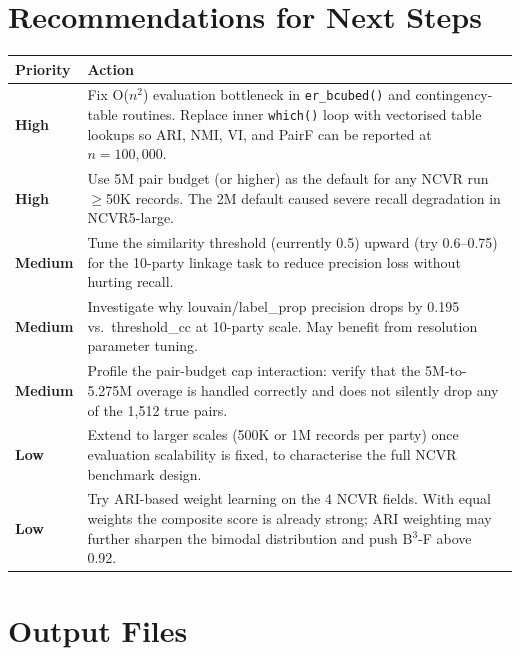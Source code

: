 \documentclass[11pt, a4paper]{article}
\begin{document}
\section{Recommendations for Next Steps}

\begin{table}[h!]
\centering
\begin{tabularx}{\linewidth}{lW}
\toprule
\textbf{Priority} & \textbf{Action} \\
\midrule
{\color{highprio}\textbf{High}} &
  Fix O($n^2$) evaluation bottleneck in \texttt{er\_bcubed()} and contingency-table
  routines. Replace inner \texttt{which()} loop with vectorised table lookups so
  ARI, NMI, VI, and PairF can be reported at $n = 100{,}000$. \\[4pt]
{\color{highprio}\textbf{High}} &
  Use 5M pair budget (or higher) as the default for any NCVR run $\geq$50K records.
  The 2M default caused severe recall degradation in NCVR5-large. \\[4pt]
{\color{medprio}\textbf{Medium}} &
  Tune the similarity threshold (currently 0.5) upward (try 0.6--0.75) for
  the 10-party linkage task to reduce precision loss without hurting recall. \\[4pt]
{\color{medprio}\textbf{Medium}} &
  Investigate why louvain/label\_prop precision drops by 0.195 vs.\ threshold\_cc
  at 10-party scale. May benefit from resolution parameter tuning. \\[4pt]
{\color{medprio}\textbf{Medium}} &
  Profile the pair-budget cap interaction: verify that the 5M-to-5.275M overage
  is handled correctly and does not silently drop any of the 1,512 true pairs. \\[4pt]
{\color{lowprio}\textbf{Low}} &
  Extend to larger scales (500K or 1M records per party) once evaluation
  scalability is fixed, to characterise the full NCVR benchmark design. \\[4pt]
{\color{lowprio}\textbf{Low}} &
  Try ARI-based weight learning on the 4 NCVR fields. With equal weights the
  composite score is already strong; ARI weighting may further sharpen the
  bimodal distribution and push B$^3$-F above 0.92. \\
\bottomrule
\end{tabularx}
\end{table}

\section{Output Files}
\end{document}
